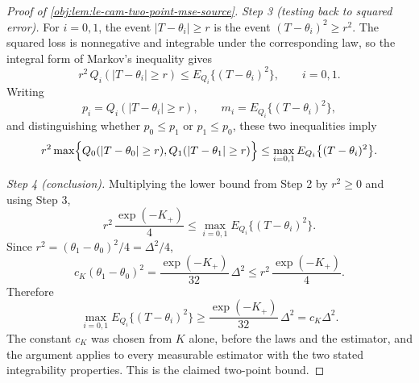 \begin{proof}[Proof of \cref{obj:lem:le-cam-two-point-mse-source}]
\emph{Step 3 (testing back to squared error).} For \(i=0,1\), the event
\(|T-\theta_i|\ge r\) is the event \((T-\theta_i)^2\ge r^2\). The squared loss is nonnegative and
integrable under the corresponding law, so the integral form of Markov's inequality gives
\[
r^2\,Q_i(|T-\theta_i|\ge r)
\le
E_{Q_i}\bigl\{(T-\theta_i)^2\bigr\},
\qquad i=0,1 .
\]
Writing
\[
p_i=Q_i(|T-\theta_i|\ge r),
\qquad
m_i=E_{Q_i}\bigl\{(T-\theta_i)^2\bigr\},
\]
and distinguishing whether \(p_0\le p_1\) or \(p_1\le p_0\), these two inequalities imply
\[
r^2\max\Bigl\{
Q_0(|T-\theta_0|\ge r),
Q_1(|T-\theta_1|\ge r)
\Bigr\}
\le
\max_{i=0,1}E_{Q_i}\bigl\{(T-\theta_i)^2\bigr\} .
\]

\emph{Step 4 (conclusion).} Multiplying the lower bound from Step 2 by \(r^2\ge0\) and using Step 3,
\[
r^2\,\frac{\exp(-K_+)}{4}
\le
\max_{i=0,1}E_{Q_i}\bigl\{(T-\theta_i)^2\bigr\} .
\]
Since \(r^2=(\theta_1-\theta_0)^2/4=\Delta^2/4\),
\[
c_K(\theta_1-\theta_0)^2
=
\frac{\exp(-K_+)}{32}\,\Delta^2
\le
r^2\,\frac{\exp(-K_+)}{4}.
\]
Therefore
\[
\max_{i=0,1}E_{Q_i}\bigl\{(T-\theta_i)^2\bigr\}
\ge
\frac{\exp(-K_+)}{32}\,\Delta^2
=
c_K\Delta^2 .
\]
The constant \(c_K\) was chosen from \(K\) alone, before the laws and the estimator, and the argument
applies to every measurable estimator with the two stated integrability properties. This is the
claimed two-point bound. %
\end{proof}
